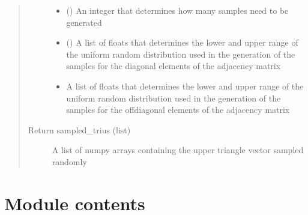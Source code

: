 \documentclass[letterpaper,10pt,english]{sphinxmanual}
\begin{document}
\begin{fulllineitems}
\begin{fulllineitems}
\begin{quote}
\begin{description}
\begin{itemize}
\item {} 
\sphinxstyleliteralstrong{\sphinxupquote{(}}\sphinxstyleliteralstrong{\sphinxupquote{)}} () \textendash{} An integer that determines how many samples need to be generated

\item {} 
\sphinxstyleliteralstrong{\sphinxupquote{(}}\sphinxstyleliteralstrong{\sphinxupquote{, }}\sphinxstyleliteralstrong{\sphinxupquote{)}} () \textendash{} A list of floats that determines the lower and upper range
of the uniform random distribution used in the generation of the samples
for the diagonal elements of the adjacency matrix

\item {} 
\sphinxstyleliteralstrong{\sphinxupquote{(}}\sphinxstyleliteralstrong{\sphinxupquote{, }}\sphinxstyleliteralstrong{\sphinxupquote{)}} \textendash{} A list of floats that determines the lower and upper range
of the uniform random distribution used in the generation of the samples
for the off\sphinxhyphen{}diagonal elements of the adjacency matrix

\end{itemize}

\item[{Return sampled\_trius (list)}] \leavevmode
A list of numpy arrays containing the upper triangle vector sampled randomly

\end{description}\end{quote}

\end{fulllineitems}


\end{fulllineitems}



\section{Module contents}
\label{\detokenize{modules/gqcml.data_generators:module-gqcml.data_generators}}\label{\detokenize{modules/gqcml.data_generators:module-contents}}
\end{document}
